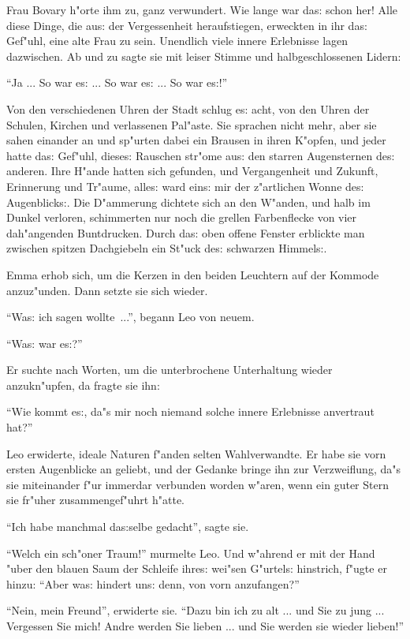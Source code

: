 \documentclass[oneside,12pt]{book}
\newcommand{\s}{s:}%
\begin{document}
Frau Bovary h"orte ihm zu, ganz verwundert. Wie lange war da{\s}
schon her! Alle diese Dinge, die au{\s} der Vergessenheit
heraufstiegen, erweckten in ihr da{\s} Gef"uhl, eine alte Frau zu
sein. Unendlich viele innere Erlebnisse lagen dazwischen. Ab und
zu sagte sie mit leiser Stimme und halbgeschlossenen Lidern:

"`Ja ... So war e{\s} ... So war e{\s} ... So war e{\s}!"'

Von den verschiedenen Uhren der Stadt schlug e{\s} acht, von den
Uhren der Schulen, Kirchen und verlassenen Pal"aste. Sie sprachen
nicht mehr, aber sie sahen einander an und sp"urten dabei ein
Brausen in ihren K"opfen, und jeder hatte da{\s} Gef"uhl,
diese{\s} Rauschen str"ome au{\s} den starren Augensternen de{\s}
anderen. Ihre H"ande hatten sich gefunden, und Vergangenheit und
Zukunft, Erinnerung und Tr"aume, alle{\s} ward ein{\s} mir der
z"artlichen Wonne de{\s} Augenblick{\s}. Die D"ammerung dichtete
sich an den W"anden, und halb im Dunkel verloren, schimmerten nur
noch die grellen Farbenflecke von vier dah"angenden Buntdrucken.
Durch da{\s} oben offene Fenster erblickte man zwischen spitzen
Dachgiebeln ein St"uck de{\s} schwarzen Himmel{\s}.

Emma erhob sich, um die Kerzen in den beiden Leuchtern auf der
Kommode anzuz"unden. Dann setzte sie sich wieder.

"`Wa{\s} ich sagen wollte~..."', begann Leo von neuem.

"`Wa{\s} war e{\s}?"'

Er suchte nach Worten, um die unterbrochene Unterhaltung wieder
anzukn"upfen, da fragte sie ihn:

"`Wie kommt e{\s}, da"s mir noch niemand solche innere Erlebnisse
anvertraut hat?"'

Leo erwiderte, ideale Naturen f"anden selten Wahlverwandte. Er
habe sie vorn ersten Augenblicke an geliebt, und der Gedanke
bringe ihn zur Verzweiflung, da"s sie miteinander f"ur immerdar
verbunden worden w"aren, wenn ein guter Stern sie fr"uher
zusammengef"uhrt h"atte.

"`Ich habe manchmal da{\s}selbe gedacht"', sagte sie.

"`Welch ein sch"oner Traum!"' murmelte Leo. Und w"ahrend er mit
der Hand "uber den blauen Saum der Schleife ihre{\s} wei"sen
G"urtel{\s} hinstrich, f"ugte er hinzu: "`Aber wa{\s} hindert
un{\s} denn, von vorn anzufangen?"'

"`Nein, mein Freund"', erwiderte sie. "`Dazu bin ich zu alt ...
und Sie zu jung ... Vergessen Sie mich! Andre werden Sie lieben
... und Sie werden sie wieder lieben!"'
\end{document}
